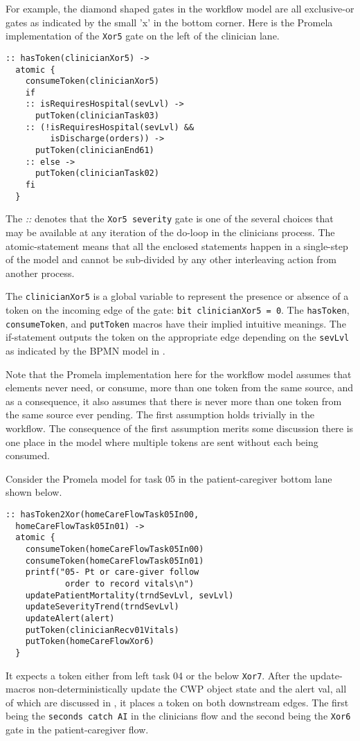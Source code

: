 For example, the diamond shaped gates in the workflow model are all exclusive-or gates as indicated by the small 'x' in the bottom corner. Here is the Promela implementation of the \texttt{Xor5} gate on the left of the clinician lane.
%
{\small
\begin{lstlisting}[style=myPromela]
:: hasToken(clinicianXor5) ->
  atomic {
    consumeToken(clinicianXor5)
    if
    :: isRequiresHospital(sevLvl) ->
      putToken(clinicianTask03)
    :: (!isRequiresHospital(sevLvl) && 
         isDischarge(orders)) ->
      putToken(clinicianEnd61)
    :: else ->
      putToken(clinicianTask02)
    fi
  }
\end{lstlisting}
}
% 
\noindent The \emph{::} denotes that the \texttt{Xor5 severity} gate is one of the several choices that may be available at any iteration of the do-loop in the clinicians process. The atomic-statement means that all the enclosed statements happen in a single-step of the model and cannot be sub-divided by any other interleaving action from another process.

The \texttt{clinicianXor5} is a global variable to represent the presence or absence of a token on the incoming edge of the gate: \texttt{bit clinicianXor5 = 0}. The \texttt{hasToken}, \texttt{consumeToken}, and \texttt{putToken} macros have their implied intuitive meanings. The if-statement outputs the token on the appropriate edge depending on the \texttt{sevLvl} as indicated by the BPMN model in . 

Note that the Promela implementation here for the workflow model assumes that elements never need, or consume, more than one token from the same source, and as a consequence, it also assumes that there is never more than one token from the same source ever pending. The first assumption holds trivially in the workflow. The consequence of the first assumption merits some discussion there is one place in the model where multiple tokens are sent without each being consumed.

Consider the Promela model for task 05 in the patient-caregiver bottom lane shown below.
%
{\small
\begin{lstlisting}[style=myPromela]
:: hasToken2Xor(homeCareFlowTask05In00, 
  homeCareFlowTask05In01) ->
  atomic {
    consumeToken(homeCareFlowTask05In00)
    consumeToken(homeCareFlowTask05In01)
    printf("05- Pt or care-giver follow
            order to record vitals\n")
    updatePatientMortality(trndSevLvl, sevLvl)
    updateSeverityTrend(trndSevLvl)
    updateAlert(alert)
    putToken(clinicianRecv01Vitals)
    putToken(homeCareFlowXor6)
  }
\end{lstlisting}
}
%
\noindent It expects a token either from left task 04 or the below \texttt{Xor7}. After the update-macros non-deterministically update the CWP object state and the alert val, all of which are discussed in , it places a token on both downstream edges. The first being the \texttt{seconds catch AI} in the clinicians flow and the second being the \texttt{Xor6} gate in the patient-caregiver flow. 

